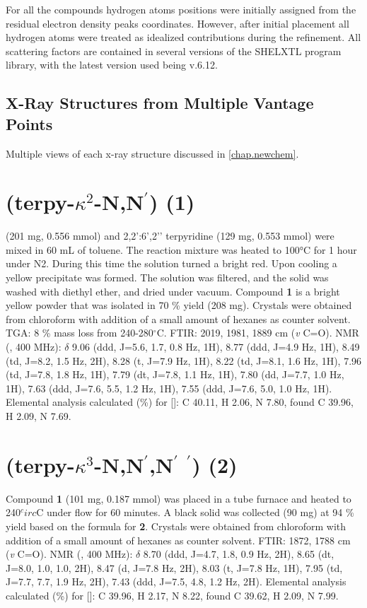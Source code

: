 For all the compounds hydrogen atoms positions were initially assigned from the residual electron density peaks coordinates. However, after initial placement all hydrogen atoms were treated as idealized contributions during the refinement. All scattering factors are contained in several versions of the SHELXTL program library, with the latest version used being v.6.12\autocite{sheldrick2008}.

\subsection{X-Ray Structures from Multiple Vantage Points} \label{ssec.views}
Multiple views of each x-ray structure discussed in \autoref{chap.newchem}.

\section{(terpy-$\kappa^2$-N,N$^\prime$) (1)} \label{sec.c1}
 (201 mg,  0.556 mmol) and 2,2’:6’,2’’ terpyridine (129 mg, 0.553 mmol) were mixed in 60 mL of toluene. The reaction mixture was heated to 100°C for 1 hour under N2. During this time the solution turned a bright red. Upon cooling a yellow precipitate was formed. The solution was filtered, and the solid was washed with diethyl ether, and dried under vacuum. Compound \textbf{1} is a bright yellow powder that was isolated in 70 \% yield (208 mg). Crystals were obtained from chloroform with addition of a small amount of hexanes as counter solvent. TGA: 8 \% mass loss from 240-280$^\circ$C.  FTIR: 2019, 1981, 1889 cm (\textit{v} C=O).  NMR (, 400 MHz): $\delta$ 9.06 (ddd, J=5.6, 1.7, 0.8 Hz, 1H), 8.77 (ddd, J=4.9 Hz, 1H), 8.49 (td, J=8.2, 1.5 Hz, 2H), 8.28 (t, J=7.9 Hz, 1H), 8.22 (td, J=8.1, 1.6 Hz, 1H), 7.96 (td, J=7.8, 1.8 Hz, 1H), 7.79 (dt, J=7.8, 1.1 Hz, 1H), 7.80 (dd, J=7.7, 1.0 Hz, 1H), 7.63 (ddd, J=7.6, 5.5, 1.2 Hz, 1H), 7.55 (ddd, J=7.6, 5.0, 1.0 Hz, 1H). Elemental analysis calculated (\%) for []: C 40.11, H 2.06, N 7.80, found C 39.96, H 2.09, N 7.69.

\section{(terpy-$\kappa^3$-N,N$^\prime$,N$^\prime$ $^\prime$) (2)} \label{sec.c2}
Compound \textbf{1} (101 mg, 0.187 mmol) was placed in a tube furnace and heated to 240$^circ$C under  flow for 60 minutes. A black solid was collected (90 mg) at 94 \% yield based on the formula for \textbf{2}. Crystals were obtained from chloroform with addition of a small amount of hexanes as counter solvent. FTIR: 1872, 1788 cm (\textit{v} C=O).  NMR (, 400 MHz): $\delta$ 8.70 (ddd, J=4.7, 1.8, 0.9 Hz, 2H), 8.65 (dt, J=8.0, 1.0, 1.0, 2H), 8.47 (d, J=7.8 Hz, 2H), 8.03 (t, J=7.8 Hz, 1H), 7.95 (td, J=7.7, 7.7, 1.9 Hz, 2H), 7.43 (ddd, J=7.5, 4.8, 1.2 Hz, 2H). Elemental analysis calculated (\%) for []: C 39.96, H 2.17, N 8.22, found C 39.62, H 2.09, N 7.99.

